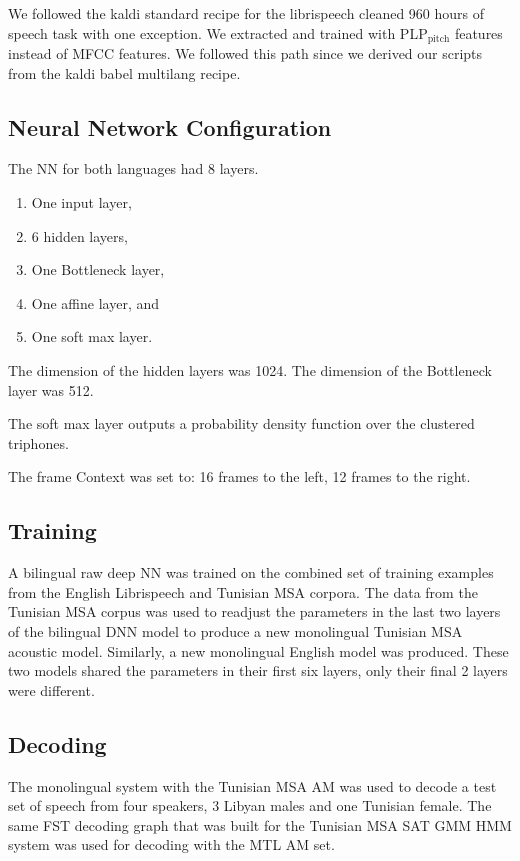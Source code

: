 \documentclass[11pt]{article}
\begin{document}
We followed the kaldi standard recipe for the librispeech cleaned 960 hours of speech task with one exception. 
We extracted and trained with \gls{PLP}$_{\text{pitch}}$ features instead of \gls{MFCC} features. 
We followed this path since we derived our scripts from the kaldi babel multilang recipe. 

\subsection{Neural Network Configuration}
\label{sec:nnconfig}


The \gls{NN} for both languages had 8 layers.

\begin{enumerate}
\item One input layer,
\item 6 hidden layers,
\item One Bottleneck layer,
\item One affine layer, and
\item One soft max layer.
\end{enumerate}

The dimension of the hidden layers was 1024.
The dimension of the Bottleneck layer was 512.

The soft max layer outputs a probability density function over the clustered triphones.

The frame Context was set to:
16 frames to the left, 12 frames to the right.

\subsection{Training}
\label{sec:train}


A bilingual raw deep \gls{NN}  was trained on the combined set of training examples from the English Librispeech and Tunisian \gls{MSA}  corpora.
The data from the Tunisian \gls{MSA} corpus was used to readjust the parameters in the last two layers of the bilingual \gls{DNN} model to produce a new monolingual Tunisian \gls{MSA}  acoustic model. 
Similarly, a new monolingual English model was produced.
These two models shared the parameters in their first six layers, only their final 2 layers were different.

\subsection{Decoding}
\label{sec:decode}


The monolingual system with the Tunisian \gls{MSA} \gls{AM} was used to decode a test set of speech from four speakers, 3 Libyan males and one Tunisian female.
The same \gls{FST} decoding graph that was built for the Tunisian \gls{MSA} \gls{SAT} \gls{GMM} \gls{HMM} system was used for decoding with the \gls{MTL} \gls{AM} set.
\end{document}
